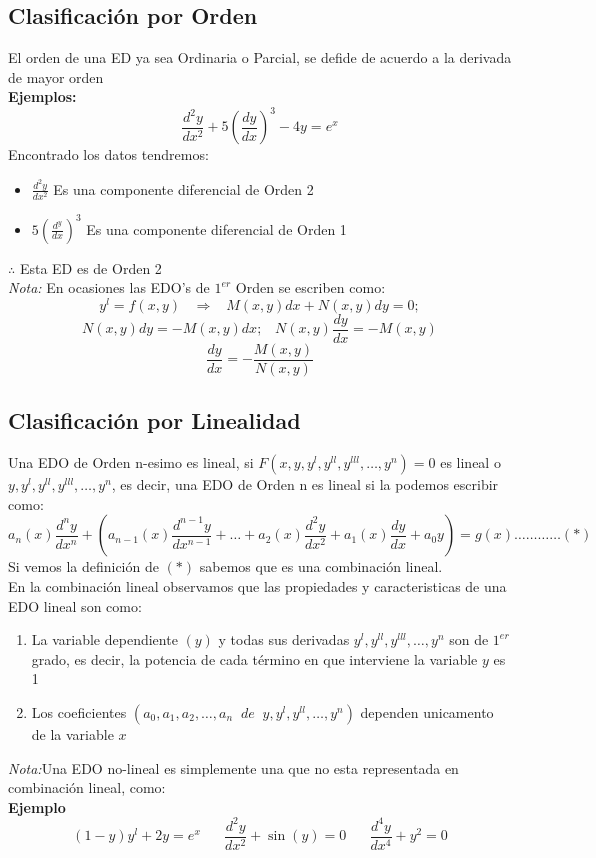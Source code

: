 \documentclass[10pt,executivepaper]{article}
\begin{document}
\subsection{Clasificación por Orden}
El orden de una ED ya sea Ordinaria o Parcial, se defide de acuerdo a la derivada de mayor orden\\
\textbf{Ejemplos:}
\[\frac{d^{2}y}{dx^{2}}+5\left(\frac{dy}{dx}\right)^{3}-4y=e^{x}\]
Encontrado los datos tendremos:
\begin{itemize}
  \item $\frac{d^{2}y}{dx^{2}}$ Es una componente diferencial de Orden 2
  \item $5\left(\frac{d^y}{dx}\right)^{3}$ Es una componente diferencial de Orden 1
\end{itemize}
$\therefore$ Esta ED es de Orden 2\\
\textit{Nota:} En ocasiones las EDO's de $1^{er}$ Orden se escriben como:
\[y^{l}=f(x,y) \;\;\;\Rightarrow\;\;\; M(x,y)dx+N(x,y)dy=0;\]
\[N(x,y)dy=-M(x,y)dx;\;\;\;N(x,y)\frac{dy}{dx}=-M(x,y)\]
\[\frac{dy}{dx}=-\frac{M(x,y)}{N(x,y)}\]

\subsection{Clasificación por Linealidad}
Una EDO de Orden n-esimo es lineal, si $F(x,y,y^{l},y^{ll},y^{lll},\ldots,y^{n})=0$ es lineal o $y,y^{l},y^{ll},y^{lll},\ldots,y^{n}$, es decir, una EDO de Orden n es lineal si la podemos escribir como:
\[a_{n}(x)\frac{d^{n}y}{dx^{n}}+\left( a_{n-1}(x)\frac{d^{n-1}y}{dx^{n-1}}+\ldots+a_{2}(x)\frac{d^{2}y}{dx^{2}}+a_{1}(x)\frac{dy}{dx}+a_{0}y\right)=g(x)\ldots\ldots\ldots\ldots(*)\]
Si vemos la definición de $(*)$ sabemos que es una combinación lineal.\\
En la combinación lineal observamos que las propiedades y caracteristicas de una EDO lineal son como:
\begin{enumerate}
  \item La variable dependiente $(y)$ y todas sus derivadas $y^{l},y^{ll},y^{lll},\ldots,y^{n}$ son de $1^{er}$ grado, es decir, la potencia de cada término en que interviene la variable $y$ es 1
  \item Los coeficientes $\left(a_{0},a_{1},a_{2},\ldots,a_{n}\;\;de\;\;y,y^{l},y^{ll},\ldots,y^{n}\right)$ dependen unicamento de la variable $x$
\end{enumerate}
\textit{Nota:}Una EDO no-lineal es simplemente una que no esta representada en combinación lineal, como:\\
\textbf{Ejemplo}
\[(1-y)y^{l}+2y=e^{x}\;\;\;\;\;\;\frac{d^{2}y}{dx^{2}}+\sin(y)=0\;\;\;\;\;\;\frac{d^{4}y}{dx^{4}}+y^{2}=0\]

\printindex
\end{document}
